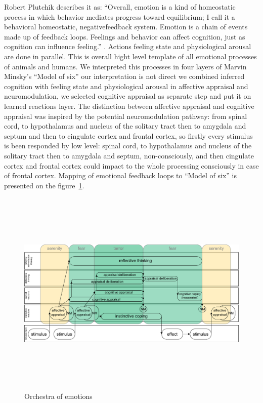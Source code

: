 Robert Plutchik describes it as: ``Overall, emotion is a kind of homeostatic process in which behavior mediates progress toward equilibrium; I call it a behavioral homeostatic, negativefeedback system. Emotion is a chain of events made up of feedback loops. Feelings and behavior can affect cognition, just as cognition can influence feeling.'' \cite{natureofemotions}. Actions feeling state and physiological arousal are done in parallel. This is overall hight level template of all emotional processes of animals and humans. We interpreted this processes in four layers of Marvin Minsky's ``Model of six'' our interpretation is not direct we combined inferred cognition with feeling state and physiological arousal in affective appraisal and neuromodulation, we selected cognitive appraisal as separate step and put it on learned reactions layer. The distinction between affective appraisal and cognitive appraisal was inspired by \cite{emotionsbraintorobot, neuromodulatory} the potential neuromodulation pathway: from spinal cord, to hypothalamus and nucleus of the solitary tract then to amygdala and septum and then to cingulate cortex and frontal cortex, so firstly every stimulus is been responded by low level: spinal cord, to hypothalamus and nucleus of the solitary tract then to amygdala and septum, non-consciously, and then cingulate cortex and frontal cortex could impact to the whole processing consciously in case of frontal cortex. 
Mapping of emotional feedback loops to ``Model of six'' is presented on the figure~\ref{orchestra_of_emotions}.

\begin{figure}
\begin{center}
 \includegraphics[height=10cm, angle=90]{figure2_orchestra_of_emotions}
\end{center}
\caption{Orchestra of emotions \label{orchestra_of_emotions}}
\end{figure}

